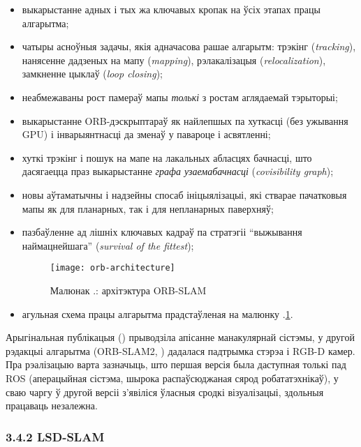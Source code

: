 \begin{itemize}
  \item выкарыстанне адных і тых жа ключавых кропак на ўсіх этапах працы алгарытма;
  \item чатыры асноўныя задачы, якія адначасова рашае алгарытм: трэкінг (\textit{tracking}),
  нанясенне дадзеных на мапу (\textit{mapping}), рэлакалізацыя (\textit{relocalization}),
  замкненне цыклаў (\textit{loop closing});
  \item неабмежаваны рост памераў мапы \textit{толькі} з ростам аглядаемай тэрыторыі;
  \item выкарыстанне ORB-дэскрыптараў як найлепшых па хуткасці (без ужывання GPU)
  і інварыянтнасці да зменаў у павароце і асвятленні;
  \item хуткі трэкінг і пошук на мапе на лакальных абласцях бачнасці, што дасягаецца
  праз выкарыстанне \textit{графа узаемабачнасці} (\textit{covisibility graph});
  \item новы аўтаматычны і надзейны спосаб ініцыялізацыі, які стварае пачатковыя мапы
  як для планарных, так і для непланарных паверхняў;
  \item пазбаўленне ад лішніх ключавых кадраў па стратэгіі ``выжывання наймацнейшага''
  (\textit{survival of the fittest});

  \begin{figure}[H]
    \centering
    \texttt{[image: orb-architecture]}
    \captionsetup{labelformat=empty}
    \caption{Малюнак \cursection.: архітэктура ORB-SLAM}
    \label{fig:orb-architecture}
  \end{figure}

  \item агульная схема працы алгарытма прадстаўленая на малюнку \cursection.\ref{fig:orb-architecture}.
\end{itemize}

Арыгінальная публікацыя (\cite{murTRO2015}) прыводзіла апісанне манакулярнай сістэмы,
у другой рэдакцыі алгарытма (ORB-SLAM2, \cite{murORB2}) дадалася падтрымка стэрэа і RGB-D камер.
Пра рэалізацыю варта зазначыць, што першая версія была даступная толькі пад ROS
(аперацыйная сістэма, шырока распаўсюджаная сярод робататэхнікаў),
у сваю чаргу ў другой версіі з'явіліся ўласныя сродкі візуалізацыі, здольныя працаваць незалежна.

\renewcommand{\nextTitle}{3.4.2 LSD-SLAM}
\addcontentsline{toc}{subsubsection}{\nextTitle}
\subsubsection*{\nextTitle}

